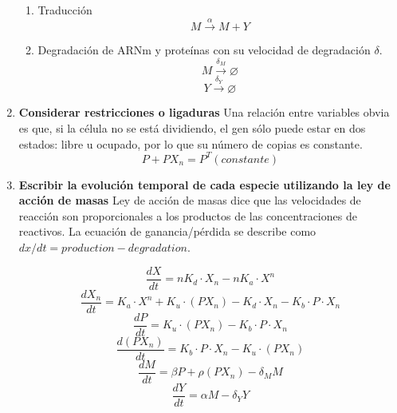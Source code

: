 \begin{enumerate}
\begin{enumerate}
\item Traducción
$$M \xrightarrow{\alpha} M + Y$$

\item Degradación de ARNm y proteínas con su velocidad de degradación $\delta$.
$$M \xrightarrow{\delta_M} \varnothing$$
$$Y \xrightarrow{\delta_Y} \varnothing$$
\end{enumerate}

\item \textbf{Considerar restricciones o ligaduras}
Una relación entre variables obvia es que, si la célula no se está dividiendo, el gen sólo puede estar en dos estados: libre u ocupado, por lo que su número de copias es constante.
$$P + PX_n = P^T (constante)$$

\item \textbf{Escribir la evolución temporal de cada especie utilizando la ley de acción de masas}
Ley de acción de masas dice que las velocidades de reacción son proporcionales a los productos de las concentraciones de reactivos.
La ecuación de ganancia/pérdida se describe como $dx/dt = production - degradation$. 

\begin{equation}
\tag{a}
\frac{dX}{dt} = nK_d \cdot X_n - nK_a \cdot X^n
\end{equation}
\begin{equation}
\tag{a,b}
\frac{dX_n}{dt} = K_a \cdot X^n + K_u \cdot (PX_n) - K_d \cdot X_n - K_b \cdot P \cdot X_n
\end{equation}
\begin{equation}
\tag{b}
\frac{dP}{dt} = K_u \cdot (PX_n) - K_b \cdot P \cdot X_n
\end{equation}
\begin{equation}
\tag{c}
\frac{d(PX_n)}{dt} = K_b \cdot P \cdot X_n - K_u \cdot (PX_n)
\end{equation}
\begin{equation}
\tag{c,e}
\frac{dM}{dt} = \beta P + \rho (PX_n) - \delta_M M
\end{equation}
\begin{equation}
\tag{d,e}
\frac{dY}{dt} = \alpha M - \delta_Y Y
\end{equation}


\end{enumerate}
